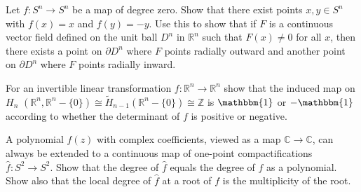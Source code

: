 \documentclass[12pt]{article}
\newcommand{\Z}{\mathbb{Z}}
\newcommand{\R}{\mathbb{R}}
\begin{document}
\begin{statement}[4]
  Let $f:S^n \to S^n$ be a map of degree zero. Show that there exist points $x,y \in S^n$ with $f(x)=x$ and $f(y)=-y$. Use this to 
  show that if $F$ is a continuous vector field defined on the unit ball $D^n$ in $\mathbb{R}^n$ such that $F(x) \neq 0$ 
  for all $x$, then there exists a point on $\partial D^n$ where $F$ points radially outward and another point on 
  $\partial D^n$ where $F$ points radially inward. 
\end{statement}
\begin{newproof}

\end{newproof}

\begin{statement}[5]
  For an invertible linear transformation $f: \R^n \to \R^n$ show that the induced map on $H_n$ 
  $(\R^n, \R^n - \{0\}) \cong \tilde{H}_{n-1}(\R^n - \{0\}) \cong \Z$ is $\mathbbm{1}$ or $-\mathbbm{1}$ 
  according to whether the determinant of $f$ is positive or negative.
\end{statement}
\begin{newproof}

\end{newproof}

\begin{statement}[6]
  A polynomial $f(z)$ with complex coefficients, viewed as a map $\mathbb{C} \to \mathbb{C}$, can always be extended 
  to a continuous map of one-point compactifications $\hat{f}:S^2 \to S^2$. Show that the degree of $\hat{f}$ 
  equals the degree of $f$ as a polynomial. Show also that the local degree of $\hat{f}$ at a root of $f$ 
  is the multiplicity of the root.
\end{statement}
\begin{newproof}

\end{newproof}
\end{document}
